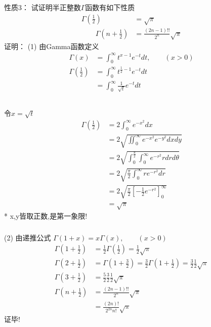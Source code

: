 \begin{frame}
	\alert{性质3：} 试证明半正整数$\Gamma$函数有如下性质 
	\begin{equation*}
		\begin{split}
		\Gamma(\frac{1}{2}) &=\sqrt{\pi} \\ 
		\qquad  \Gamma(n+\frac{1}{2}) &= \frac{(2n-1)!!}{2^n} \sqrt{\pi}
		\end{split}	
	\end{equation*}	
	\alert{证明：}  (1) 由Gamma函数定义
	\[
	\begin{aligned}
		 \Gamma(x)&=\int_{0}^{\infty} t^{x-1} e^{-t} dt, \qquad (x>0) \\
		 \Gamma(\frac{1}{2})&=\int_{0}^{\infty} t^{\frac{1}{2}-1} e^{-t} dt\\
		 &=\int_{0}^{\infty} \frac{1}{\sqrt{t}} e^{-t} dt\\
	\end{aligned}	
	\]
\end{frame}

\begin{frame}
	  \frametitle{}
	  令$x=\sqrt{t}$
	  \[
		\begin{aligned}
			 \Gamma(\frac{1}{2})
			 &=2\int_{0}^{\infty} e^{-x^2} dx\\
			 &=2\sqrt{\iint_{0}^{\infty} e^{-x^2} e^{-y^2} dxdy}\\
			 &=2\sqrt{\int_{0}^{\frac{\pi}{2}} \int_{0}^{\infty}  e^{-r^2} r dr d\theta}\\
			 &=2\sqrt{\frac{\pi}{2} \int_{0}^{\infty} r e^{-r^2} dr }\\
			 &=2\sqrt{\frac{\pi}{2}[-\frac{1}{2} e^{-r^2}]_{0}^{\infty} }\\
			 &=\sqrt{\pi}
		\end{aligned}	
		\]  
	* x,y皆取正数,是第一象限!			
\end{frame}	

\begin{frame}
	  \frametitle{}
	  (2) 由递推公式 $\Gamma(1+x)=x \Gamma(x) ,\qquad (x>0)$\\
	  \[
	\begin{aligned}
		\Gamma(1+\frac{1}{2})&= \frac{1}{2} \Gamma(\frac{1}{2}) =\frac{1}{2} \sqrt{\pi}\\
		\Gamma(2+\frac{1}{2})&= \Gamma(1+\frac{3}{2})=\frac{3}{2} \Gamma(1+\frac{1}{2}) = \frac{3}{2}\frac{1}{2}\sqrt{\pi}\\
		\Gamma(3+\frac{1}{2})& = \frac{5}{2} \frac{3}{2}\frac{1}{2}\sqrt{\pi}\\
		\Gamma(n+\frac{1}{2})& = \frac{(2n-1)!!}{2^n}\sqrt{\pi}\\
		 & = \frac{(2n)!}{2^{2n} n!}\sqrt{\pi}
	\end{aligned} 
	  \]
	证毕!
\end{frame}

